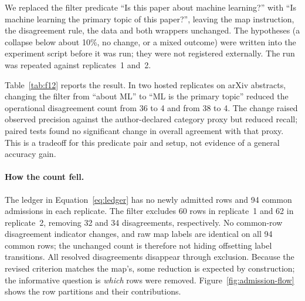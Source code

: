 \documentclass[11pt]{article}
\begin{document}
We replaced the filter predicate ``Is this paper about machine learning?''
with ``Is machine learning the primary topic of this paper?'', leaving the
map instruction, the disagreement rule, the data and both wrappers
unchanged. The hypotheses (a collapse below about 10\%, no change, or a mixed
outcome) were written into the experiment script before it was run; they
were not registered externally. The run was repeated against replicates~1
and~2.

Table~\ref{tab:f12} reports the result. In two hosted replicates on arXiv
abstracts, changing the filter from ``about ML'' to ``ML is the primary
topic'' reduced the operational disagreement count from 36 to 4 and from 38
to 4. The change raised observed precision against the author-declared
category proxy but reduced recall; paired tests found no significant change
in overall agreement with that proxy. This is a tradeoff for this predicate
pair and setup, not evidence of a general accuracy gain.

\begin{table}[t]
\centering
\caption{Filter-criterion intervention (abstracts). Map instruction,
  disagreement rule, data and wrappers unchanged. Precision and recall are
  against the author-declared category proxy. Entries are point estimates;
  intervals are discussed in the text.}
\label{tab:f12}
\smallskip
\small
{}
\end{table}

\paragraph{How the count fell.}
The ledger in Equation~\ref{eq:ledger} has no newly admitted rows and 94
common admissions in each replicate. The filter excludes 60 rows in
replicate~1 and 62 in replicate~2, removing 32 and 34 disagreements,
respectively. No common-row disagreement indicator changes, and raw map
labels are identical on all 94 common rows; the unchanged count is therefore
not hiding offsetting label transitions. All resolved disagreements
disappear through exclusion. Because the
revised criterion matches the map's, some reduction is expected by
construction; the informative question is \emph{which} rows were removed.
Figure~\ref{fig:admission-flow} shows the row partitions and their contributions.
\end{document}
